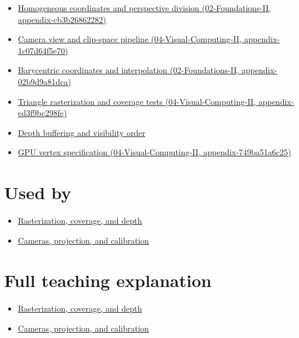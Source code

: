 \begin{itemize}
\tightlist
\item
  \href{../02-Foundations-II/main.pdf\#nameddest=appendix-cb3b26862282}{Homogeneous coordinates and perspective division (02-Foundations-II, appendix-cb3b26862282)}
\item
  \href{../04-Visual-Computing-II/main.pdf\#nameddest=appendix-1c07d64f5e70}{Camera view and clip-space pipeline (04-Visual-Computing-II, appendix-1c07d64f5e70)}
\item
  \href{../02-Foundations-II/main.pdf\#nameddest=appendix-02b9d9a81dca}{Barycentric coordinates and interpolation (02-Foundations-II, appendix-02b9d9a81dca)}
\item
  \href{../04-Visual-Computing-II/main.pdf\#nameddest=appendix-ed3f9bc298fe}{Triangle rasterization and coverage tests (04-Visual-Computing-II, appendix-ed3f9bc298fe)}
\item
  \hyperref[appendix-97578ed97952]{Depth buffering and visibility order}
\item
  \href{../04-Visual-Computing-II/main.pdf\#nameddest=appendix-749ba51a6c25}{GPU vertex specification (04-Visual-Computing-II, appendix-749ba51a6c25)}
\end{itemize}

\section{Used by}\label{appendix-40426e4b2103-used-by}

\begin{itemize}
\tightlist
\item
  \href{Continuous\%20Notes/University\%20-\%20Worlds,\%20Images\%20and\%20Inference\%20-\%20Graphics,\%20Vision\%20and\%20Photography\#Rasterization,\%20coverage,\%20and\%20depth}{Rasterization, coverage, and depth}
\item
  \href{Continuous\%20Notes/University\%20-\%20Worlds,\%20Images\%20and\%20Inference\%20-\%20Graphics,\%20Vision\%20and\%20Photography\#Cameras,\%20projection,\%20and\%20calibration}{Cameras, projection, and calibration}
\end{itemize}

\section{Full teaching explanation}\label{appendix-40426e4b2103-full-teaching-explanation}

\begin{itemize}
\tightlist
\item
  \href{Continuous\%20Notes/University\%20-\%20Worlds,\%20Images\%20and\%20Inference\%20-\%20Graphics,\%20Vision\%20and\%20Photography\#Rasterization,\%20coverage,\%20and\%20depth}{Rasterization, coverage, and depth}
\item
  \href{Continuous\%20Notes/University\%20-\%20Worlds,\%20Images\%20and\%20Inference\%20-\%20Graphics,\%20Vision\%20and\%20Photography\#Cameras,\%20projection,\%20and\%20calibration}{Cameras, projection, and calibration}
\end{itemize}

